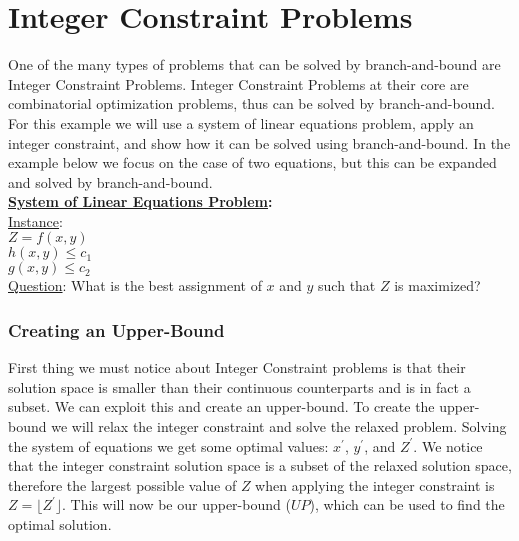 \section{Integer Constraint Problems}
    One of the many types of problems that can be solved by 
    branch-and-bound are Integer Constraint Problems. 
    Integer Constraint Problems at their core are combinatorial 
    optimization problems, thus can be solved by branch-and-bound.
    For this example we will use a system of linear equations problem,
    apply an integer constraint, and show how it can be solved using 
    branch-and-bound. In the example below we focus on the case of 
    two equations, but this can be expanded and solved by branch-and-bound.
    \\ 
    \noindent
	\textbf{\underline{System of Linear Equations Problem}:}\\
	\underline{Instance}: \\ $Z = f(x,y)$  \\ $h(x,y) \leq c_1$ \\ $g(x,y) \leq c_2 $ \\
	\underline{Question}: What is the best assignment of $x$ and $y$ such that $Z$ is maximized?
    \\

        \subsubsection{Creating an Upper-Bound}
        First thing we must notice about Integer Constraint problems is that
        their solution space is smaller than their continuous counterparts and 
        is in fact a subset.
        We can exploit this and create an upper-bound. To create the upper-bound
        we will relax the integer constraint and solve the relaxed problem.
        Solving the system of equations we get some optimal values: $x^{'}$, $y^{'}$, 
        and $Z^{'}$. We notice that the integer constraint solution
        space is a subset of the relaxed solution space, therefore the largest
        possible value of $Z$ when applying the integer constraint is 
        $ Z = \lfloor Z^{'} \rfloor$. This will now be our upper-bound ($UP$), which can be used
        to find the optimal solution.

